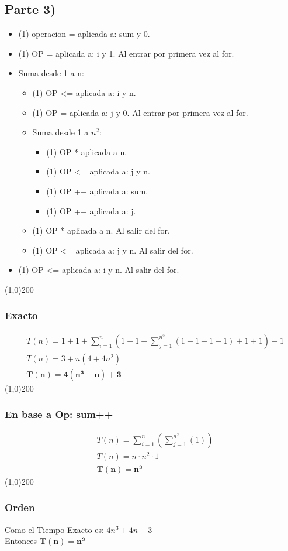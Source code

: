 \subsection*{Parte 3)}
\begin{itemize}
  \item (1) operacion = aplicada a: sum y 0.
  \item (1) OP = aplicada a: i y 1. Al entrar por primera vez al for.
  \item Suma desde 1 a n:
  \begin{itemize}
    \item (1) OP <= aplicada a: i y n.
    \item (1) OP = aplicada a: j y 0. Al entrar por primera vez al for.
    \item Suma desde 1 a $n^2$:
      \begin{itemize}
        \item (1) OP * aplicada a n.
        \item (1) OP <= aplicada a: j y n.
        \item (1) OP ++ aplicada a: sum.
        \item (1) OP ++ aplicada a: j.
      \end{itemize}
    \item (1) OP * aplicada a n. Al salir del for.
    \item (1) OP <= aplicada a: j y n. Al salir del for.
  \end{itemize}
\item (1) OP <= aplicada a: i y n. Al salir del for.
\end{itemize}
\line(1,0){200}
\subsubsection*{Exacto}
\begin{align*}
&T(n) = 1+1+\sum_{i=1}^{n}\left(1+1+\sum_{j=1}^{n^2}{(1+1+1+1)}+1+1\right) + 1\\
&T(n) = 3 + n(4 + 4n^2)\\ 
&\mathbf{T(n) = 4(n^3+n)+3}
\end{align*}
\line(1,0){200}
\subsubsection*{En base a Op: sum++}
\begin{align*}
&T(n) = \sum_{i=1}^{n}\left(\sum_{j=1}^{n^2}(1)\right)\\
&T(n) = n \cdot n^2 \cdot 1\\
&\mathbf{T(n) = n^3}
\end{align*}
\line(1,0){200}
\subsubsection*{Orden}
Como el Tiempo Exacto es: $\displaystyle 4n^3 + 4n + 3$\\
Entonces $\mathbf{T(n) = n^3}$
